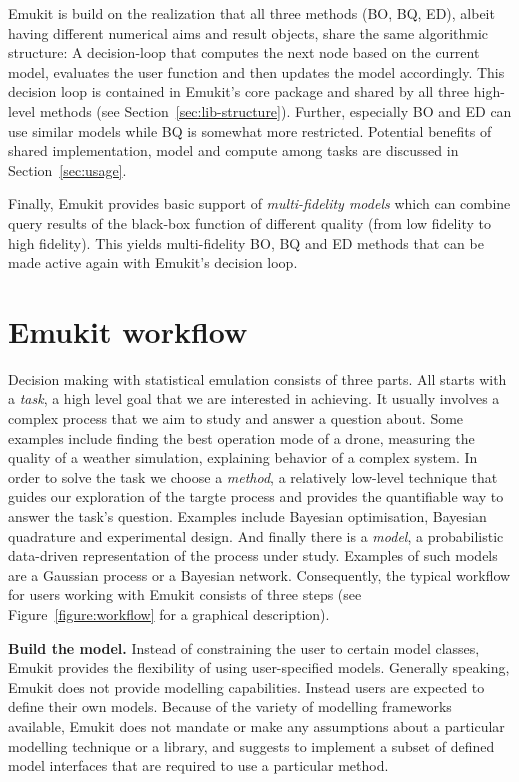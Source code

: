 Emukit is build on the realization that all three methods (BO, BQ, ED), albeit having different numerical aims and result objects, share the same algorithmic structure: A decision-loop that computes the next node based on the current model, evaluates the user function and then updates the model accordingly. This decision loop is contained in Emukit's core package and shared by all three high-level methods (see Section~\ref{sec:lib-structure}).
Further, especially BO and ED can use similar models while BQ is somewhat more restricted. Potential benefits of shared implementation, model and compute among tasks are discussed in Section~\ref{sec:usage}.

Finally, Emukit provides basic support of \emph{multi-fidelity models} \cite{Peherstorfer2017} which can combine query results of the black-box function of different quality (from low fidelity to high fidelity). This yields multi-fidelity BO, BQ and ED methods that can be made active again with Emukit's decision loop.


\section{Emukit workflow}\label{sec:workflow}
Decision making with statistical emulation consists of three parts. All starts with a \textit{task}, a high level goal that we are interested in achieving. It usually involves a complex process that we aim to study and answer a question about. Some examples include finding the best operation mode of a drone, measuring the quality of a weather simulation, explaining behavior of a complex system. In order to solve the task we choose a \textit{method}, a relatively low-level technique that guides our exploration of the targte process and provides the quantifiable way to answer the task's question. Examples include Bayesian optimisation, Bayesian quadrature and experimental design. And finally there is a \textit{model}, a probabilistic data-driven representation of the process under study. Examples of such models are a Gaussian process or a Bayesian network. Consequently, the typical workflow for users working with Emukit consists of three steps (see Figure~\ref{figure:workflow} for a graphical description).

\textbf{Build the model.} Instead of constraining the user to certain model classes, Emukit provides the flexibility of using user-specified models. Generally speaking, Emukit does not provide modelling capabilities. Instead users are expected to define their own models. Because of the variety of modelling frameworks available, Emukit does not mandate or make any assumptions about a particular modelling technique or a library, and suggests to implement a subset of defined model interfaces that are required to use a particular method.

